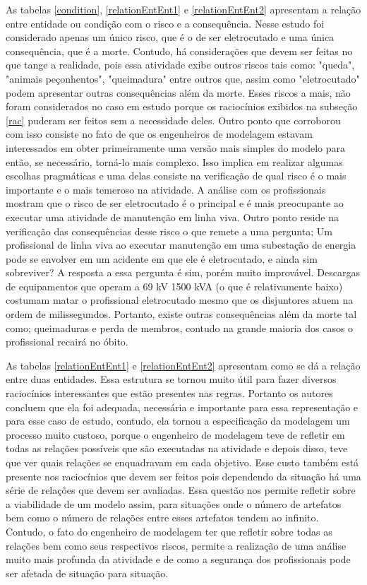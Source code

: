As tabelas \ref{condition}, \ref{relationEntEnt1} e \ref{relationEntEnt2} apresentam a relação entre entidade ou condição com o risco e a consequência. Nesse estudo foi considerado apenas um único risco, que é o de ser eletrocutado e uma única consequência, que é a morte. Contudo, há considerações que devem ser feitas no que tange a realidade, pois essa atividade exibe outros riscos tais como: "queda", "animais peçonhentos", "queimadura" entre outros que, assim como "eletrocutado" podem apresentar outras consequências além da morte. Esses riscos a mais, não foram considerados no caso em estudo porque os raciocínios exibidos na subseção \ref{rac} puderam ser feitos sem a necessidade deles. Outro ponto que corroborou com isso consiste no fato de que os engenheiros de modelagem estavam interessados em obter primeiramente uma versão mais simples do modelo para então, se necessário, torná-lo mais complexo. Isso implica em realizar algumas escolhas pragmáticas e uma delas consiste na verificação de qual risco é o mais importante e o mais temeroso na atividade. A análise com os profissionais mostram que o risco de 
ser eletrocutado é o principal e é mais preocupante ao executar uma atividade de manutenção em linha viva. Outro ponto reside na verificação das consequências desse risco o que remete a uma pergunta; Um profissional de linha viva ao executar manutenção em uma subestação de energia pode se envolver em um acidente em que ele é eletrocutado, e ainda sim sobreviver? A resposta a essa pergunta é sim, porém muito improvável. Descargas de equipamentos que operam a 69 kV 1500 kVA  (o que é relativamente baixo) costumam matar o profissional eletrocutado mesmo que 
os disjuntores atuem na ordem de milissegundos. Portanto, existe outras consequências além da morte tal como; queimaduras e perda de membros, contudo na grande maioria dos casos o profissional recairá no óbito. 

As tabelas \ref{relationEntEnt1} e \ref{relationEntEnt2} apresentam como se dá a relação entre duas entidades. Essa estrutura se tornou muito útil para fazer diversos raciocínios interessantes que estão presentes nas regras. Portanto os autores concluem que ela foi adequada, necessária e importante para essa representação e para esse caso de estudo, contudo, ela tornou a especificação da modelagem um processo muito custoso, porque o engenheiro de modelagem teve de refletir em todas as relações possíveis que são executadas na atividade e depois disso, teve 
que ver quais relações se enquadravam em cada objetivo. Esse custo também está presente nos raciocínios que devem ser feitos pois dependendo da situação há uma série de relações que devem ser avaliadas. Essa questão nos permite refletir sobre a viabilidade de um modelo assim, para situações onde o número de artefatos bem como o número de relações entre esses artefatos tendem ao infinito. Contudo, o fato do engenheiro de modelagem ter que refletir sobre todas as relações bem como seus respectivos riscos, permite a realização de uma análise muito mais profunda 
da atividade e de como a segurança dos profissionais pode ser afetada de situação para situação. 

